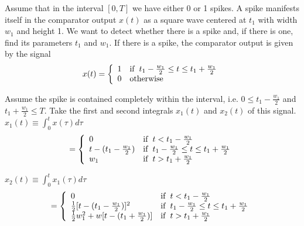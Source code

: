 \documentclass[journal]{IEEEtran}
\begin{document}
\indent\indent Assume that in the interval $[0,T]$ we have either 0 or 1 spikes. A spike manifests itself in the comparator output $x(t)$ as a square wave centered at $t_1$ with width $w_1$ and height 1. We want to detect whether there is a spike and, if there is one, find its parameters $t_1$ and $w_1$. If there is a spike, the comparator output is given by the signal\\

\begin{equation}
x(t) = \left\{
\begin{array}{l l}
  1 & \mathrm{if}\,\,\, t_1-\frac{w_1}{2} \le t \le t_1+\frac{w_1}{2}\\
  0 & \mathrm{otherwise}\\
\end{array}
\right.
\end{equation}

Assume the spike is contained completely within the interval, i.e. $0 \le t_1 - \frac{w_1}{2}$ and $t_1+\frac{w_1}{2} \le T$. Take the first and second integrals $x_1(t)$ and $x_2(t)$ of this signal.\\

$\displaystyle x_1(t) \equiv \int_0^t x(\tau) d\tau $\\
\begin{equation}
= \left\{
\begin{array}{l l}
  0 & \mathrm{if}\,\,\, t < t_1 - \frac{w_1}{2}\\
  t - (t_1-\frac{w_1}{2}) & \mathrm{if}\,\,\, t_1-\frac{w_1}{2} \le t \le t_1+\frac{w_1}{2}\\
  w_1 & \mathrm{if}\,\,\, t > t_1 + \frac{w_1}{2}\\
\end{array}
\right.
\end{equation}

$\displaystyle x_2(t) \equiv \int_0^t x_1(\tau) d\tau$\\
\begin{equation}
= \left\{
\begin{array}{l l}
  0 & \mathrm{if}\,\,\, t < t_1 - \frac{w_1}{2}\\
  \frac{1}{2}[t - (t_1-\frac{w_1}{2})]^2 & \mathrm{if}\,\,\, t_1-\frac{w_1}{2} \le t \le t_1+\frac{w_1}{2}\\
  \frac{1}{2}w_1^2 + w[t - (t_1+\frac{w_1}{2})] & \mathrm{if}\,\,\, t > t_1 + \frac{w_1}{2}\\
\end{array}
\right.
\end{equation}
\end{document}

